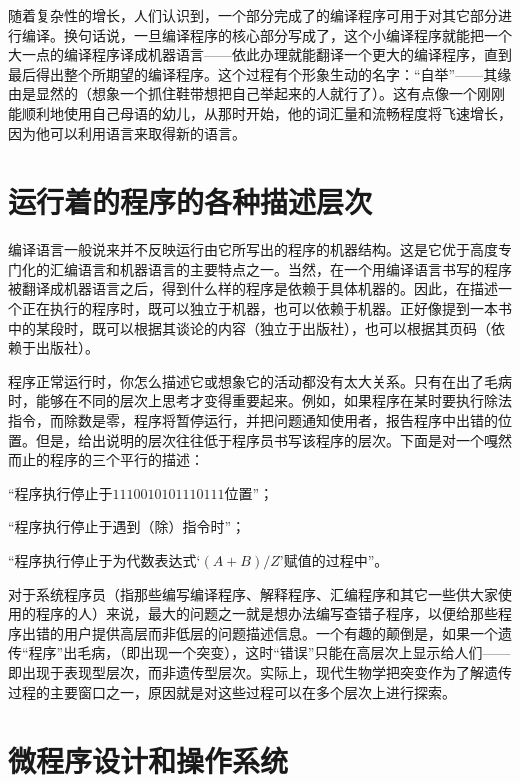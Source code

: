 随着复杂性的增长，人们认识到，一个部分完成了的编译程序可用于对其它部分进行编译。换句话说，一旦编译程序的核心部分写成了，这个小编译程序就能把一个大一点的编译程序译成机器语言——依此办理就能翻译一个更大的编译程序，直到最后得出整个所期望的编译程序。这个过程有个形象生动的名字：“自举”——其缘由是显然的（想象一个抓住鞋带想把自己举起来的人就行了）。这有点像一个刚刚能顺利地使用自己母语的幼儿，从那时开始，他的词汇量和流畅程度将飞速增长，因为他可以利用语言来取得新的语言。

\section{运行着的程序的各种描述层次}

编译语言一般说来并不反映运行由它所写出的程序的机器结构。这是它优于高度专门化的汇编语言和机器语言的主要特点之一。当然，在一个用编译语言书写的程序被翻译成机器语言之后，得到什么样的程序是依赖于具体机器的。因此，在描述一个正在执行的程序时，既可以独立于机器，也可以依赖于机器。正好像提到一本书中的某段时，既可以根据其谈论的内容（独立于出版社），也可以根据其页码（依赖于出版社）。

程序正常运行时，你怎么描述它或想象它的活动都没有太大关系。只有在出了毛病时，能够在不同的层次上思考才变得重要起来。例如，如果程序在某时要执行除法指令，而除数是零，程序将暂停运行，并把问题通知使用者，报告程序中出错的位置。但是，给出说明的层次往往低于程序员书写该程序的层次。下面是对一个嘎然而止的程序的三个平行的描述：

\begin{description}[style=nextline,format=\sffamily\itemcolon,
  labelindent=\parindent,leftmargin=2\parindent,itemindent=!]
\item[机器语言层]“程序执行停止于$1110010101110111$位置”；
\item[汇编语言层]“程序执行停止于遇到（除）指令时”；
\item[编译语言层]“程序执行停止于为代数表达式‘$(A+B)/Z$’赋值的过程中”。
\end{description}

对于系统程序员（指那些编写编译程序、解释程序、汇编程序和其它一些供大家使用的程序的人）来说，最大的问题之一就是想办法编写查错子程序，以便给那些程序出错的用户提供高层而非低层的问题描述信息。一个有趣的颠倒是，如果一个遗传“程序”出毛病，（即出现一个突变），这时“错误”只能在高层次上显示给人们——即出现于表现型层次，而非遗传型层次。实际上，现代生物学把突变作为了解遗传过程的主要窗口之一，原因就是对这些过程可以在多个层次上进行探索。

\section{微程序设计和操作系统}

